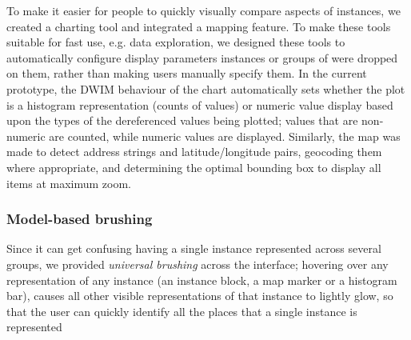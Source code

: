 \documentclass{sigchi}
\begin{document}
To make it easier for people to quickly visually compare aspects of instances, we created a charting tool and integrated a mapping feature.  To make these tools suitable for fast use, e.g. data exploration, we designed these tools to automatically configure display parameters instances or groups of were dropped on them, rather than making users manually specify them. In the current prototype, the DWIM behaviour of the chart automatically sets whether the plot is a histogram representation (counts of values) or numeric value display based upon the types of the dereferenced values being plotted; values that are non-numeric are counted, while numeric values are displayed.    Similarly, the map was made to detect address strings and latitude/longitude pairs, geocoding them where appropriate, and determining the optimal bounding box to display all items at maximum zoom.

\subsubsection{Model-based brushing}
Since it can get confusing having a single instance represented across several groups, we provided \emph{universal brushing} across the interface; hovering over any representation of any instance (an instance block, a map marker or a histogram bar), causes all other visible representations of that instance to lightly glow, so that the user can quickly identify all the places that a single instance is represented



\end{document}
